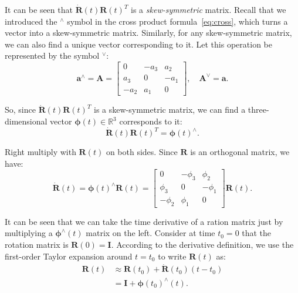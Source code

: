It can be seen that $\dot{\mathbf{R}} (t) \mathbf{R} {(t)^T}$ is a \textit{skew-symmetric} matrix. Recall that we introduced the $^\wedge$ symbol in the cross product formula~\eqref{eq:cross}, which turns a vector into a skew-symmetric matrix. Similarly, for any skew-symmetric matrix, we can also find a unique vector corresponding to it. Let this operation be represented by the symbol $^{\vee}$:
\begin{equation}
{\mathbf{a}^ \wedge } = \mathbf{A} = \left[ {\begin{array}{*{20}{c}}
    0&{ - {a_3}}&{{a_2}}\\
    {{a_3}}&0&{ - {a_1}}\\
    { - {a_2}}&{{a_1}}&0
    \end{array}} \right], \quad
{ \mathbf{A}^ \vee } = \mathbf{a}.
\end{equation}

So, since $\dot{\mathbf{R}} (t) \mathbf{R} {(t)^T}$ is a skew-symmetric matrix, we can find a three-dimensional vector $\boldsymbol{\phi} (t) \in \mathbb{R}^3$ corresponds to it:
\[
\dot{\mathbf{R}} (t) \mathbf{R}(t)^T = \boldsymbol{\phi} (t) ^ {\wedge}.
\]

Right multiply with $\mathbf{R}(t)$ on both sides. Since $\mathbf{R}$ is an orthogonal matrix, we have:
\begin{equation}
\label{eq:dR}
\dot{\mathbf{R}} (t) = \boldsymbol{\phi} (t)^{\wedge} \mathbf{R}(t) =
\left[ {\begin{array}{*{20}{c}}
    0&{ - {\phi _3}}&{{\phi _2}}\\
    {{\phi _3}}&0&{ - {\phi _1}}\\
    { - {\phi _2}}&{{\phi _1}}&0
    \end{array}} \right] \mathbf{R} (t).
\end{equation}

It can be seen that we can take the time derivative of a ration matrix just by multiplying a $\boldsymbol{\phi}^\wedge (t)$ matrix on the left. Consider at time $t_0=0$ that the rotation matrix is $\mathbf{R}(0) = \mathbf{I}$. According to the derivative definition, we use the first-order Taylor expansion around $t=t_0$ to write $\mathbf{R}(t)$ as: 
\begin{equation}
\begin{aligned}
\mathbf{R} \left( t \right) & \approx \mathbf{R} \left( t_0 \right) + \dot {\mathbf{R}} \left( {{t_0}} \right)\left ( {t - {t_0}} \right)\\
&= \mathbf{I} + \boldsymbol{\phi} {\left( {{t_0}} \right)^ \wedge } \left( t \right).
\end{aligned}
\end{equation}

